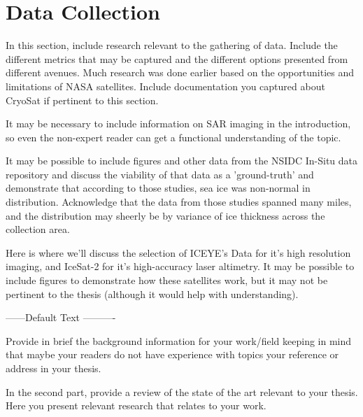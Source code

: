 \chapter{Data Collection}
\label{sec:Data_Collection}

  
In this section, include research relevant to the gathering of data. Include the different metrics that may be captured and the different options presented from different avenues. Much research was done earlier based on the opportunities and limitations of NASA satellites. Include documentation you captured about CryoSat if pertinent to this section.

It may be necessary to include information on SAR imaging in the introduction, so even the non-expert reader can get a functional understanding of the topic.

It may be possible to include figures and other data from the NSIDC In-Situ data repository and discuss the viability of that data as a 'ground-truth' and demonstrate that according to those studies, sea ice was non-normal in distribution. Acknowledge that the data from those studies spanned many miles, and the distribution may sheerly be by variance of ice thickness across the collection area.

Here is where we'll discuss the selection of ICEYE's Data for it's high resolution imaging, and IceSat-2 for it's high-accuracy laser altimetry. It may be possible to include figures to demonstrate how these satellites work, but it may not be pertinent to the thesis (although it would help with understanding).

------Default Text ----------

Provide in brief the background information for your work/field keeping in mind that maybe your readers do not have experience with topics your reference or address in your thesis. 

In the second part, provide a review of the state of the art relevant to your thesis. Here you present relevant research that relates to your work. 
